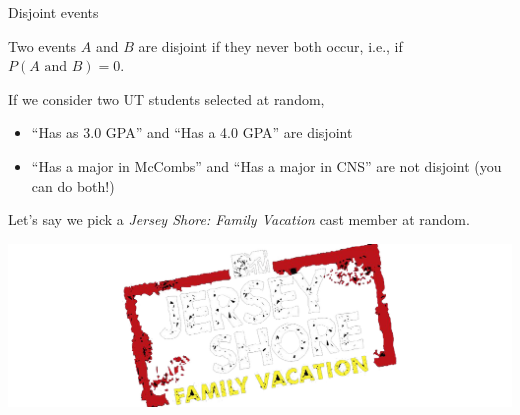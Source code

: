 \documentclass{beamer}\usepackage[]{graphicx}\usepackage[]{color}
\begin{document}
\begin{darkframes}
    \begin{frame}{Disjoint events}
      \begin{definition}
        Two events $A$ and $B$ are \alert{disjoint} if they never both occur, i.e., if $P(\text{$A$ and $B$}) = 0$.        
      \end{definition}

      \pause

      If we consider two UT students selected at random,
      \begin{itemize}
        \item ``Has as 3.0 GPA'' and ``Has a 4.0 GPA'' are disjoint
        \item ``Has a major in McCombs'' and ``Has a major in CNS'' are not disjoint (you can do both!)
      \end{itemize}
    \end{frame}


    \begin{frame}{}
      \begin{center}
        Let's say we pick a \emph{Jersey Shore: Family Vacation} cast member at random.
      \end{center}
      

      \includegraphics[width=\textwidth]{jersey-shore}
    \end{frame}


\end{darkframes}
\end{document}
